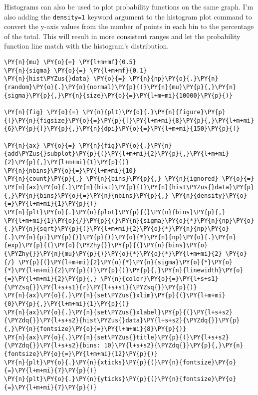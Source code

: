     Histograms can also be used to plot probability functions on the same
graph. I'm also adding the \texttt{density=1} keyword argument to the
histogram plot command to convert the y-axis values from the number of
points in each bin to the percentage of the total. This will result in
more consistent ranges and let the probability function line match with
the histogram's distribution.

    \begin{tcolorbox}[breakable, size=fbox, boxrule=1pt, pad at break*=1mm,colback=cellbackground, colframe=cellborder]
\begin{Verbatim}[commandchars=\\\{\}]
\PY{n}{mu} \PY{o}{=} \PY{l+m+mf}{0.5}
\PY{n}{sigma} \PY{o}{=} \PY{l+m+mf}{0.1}
\PY{n}{hist\PYZus{}data} \PY{o}{=} \PY{n}{np}\PY{o}{.}\PY{n}{random}\PY{o}{.}\PY{n}{normal}\PY{p}{(}\PY{n}{mu}\PY{p}{,}\PY{n}{sigma}\PY{p}{,}\PY{n}{size}\PY{o}{=}\PY{l+m+mi}{10000}\PY{p}{)}

\PY{n}{fig} \PY{o}{=} \PY{n}{plt}\PY{o}{.}\PY{n}{figure}\PY{p}{(}\PY{n}{figsize}\PY{o}{=}\PY{p}{[}\PY{l+m+mi}{8}\PY{p}{,}\PY{l+m+mi}{6}\PY{p}{]}\PY{p}{,}\PY{n}{dpi}\PY{o}{=}\PY{l+m+mi}{150}\PY{p}{)} 

\PY{n}{ax} \PY{o}{=} \PY{n}{fig}\PY{o}{.}\PY{n}{add\PYZus{}subplot}\PY{p}{(}\PY{l+m+mi}{2}\PY{p}{,}\PY{l+m+mi}{2}\PY{p}{,}\PY{l+m+mi}{1}\PY{p}{)}
\PY{n}{nbins}\PY{o}{=}\PY{l+m+mi}{10}
\PY{n}{count}\PY{p}{,} \PY{n}{bins}\PY{p}{,} \PY{n}{ignored} \PY{o}{=} \PY{n}{ax}\PY{o}{.}\PY{n}{hist}\PY{p}{(}\PY{n}{hist\PYZus{}data}\PY{p}{,}\PY{n}{bins}\PY{o}{=}\PY{n}{nbins}\PY{p}{,} \PY{n}{density}\PY{o}{=}\PY{l+m+mi}{1}\PY{p}{)}
\PY{n}{plt}\PY{o}{.}\PY{n}{plot}\PY{p}{(}\PY{n}{bins}\PY{p}{,} \PY{l+m+mi}{1}\PY{o}{/}\PY{p}{(}\PY{n}{sigma}\PY{o}{*}\PY{n}{np}\PY{o}{.}\PY{n}{sqrt}\PY{p}{(}\PY{l+m+mi}{2}\PY{o}{*}\PY{n}{np}\PY{o}{.}\PY{n}{pi}\PY{p}{)}\PY{p}{)}\PY{o}{*}\PY{n}{np}\PY{o}{.}\PY{n}{exp}\PY{p}{(}\PY{o}{\PYZhy{}}\PY{p}{(}\PY{n}{bins}\PY{o}{\PYZhy{}}\PY{n}{mu}\PY{p}{)}\PY{o}{*}\PY{o}{*}\PY{l+m+mi}{2} \PY{o}{/} \PY{p}{(}\PY{l+m+mi}{2}\PY{o}{*}\PY{n}{sigma}\PY{o}{*}\PY{o}{*}\PY{l+m+mi}{2}\PY{p}{)}\PY{p}{)}\PY{p}{,}\PY{n}{linewidth}\PY{o}{=}\PY{l+m+mi}{2}\PY{p}{,} \PY{n}{color}\PY{o}{=}\PY{l+s+s1}{\PYZsq{}}\PY{l+s+s1}{r}\PY{l+s+s1}{\PYZsq{}}\PY{p}{)}
\PY{n}{ax}\PY{o}{.}\PY{n}{set\PYZus{}xlim}\PY{p}{(}\PY{l+m+mi}{0}\PY{p}{,}\PY{l+m+mi}{1}\PY{p}{)}
\PY{n}{ax}\PY{o}{.}\PY{n}{set\PYZus{}xlabel}\PY{p}{(}\PY{l+s+s2}{\PYZdq{}}\PY{l+s+s2}{hist\PYZus{}data}\PY{l+s+s2}{\PYZdq{}}\PY{p}{,}\PY{n}{fontsize}\PY{o}{=}\PY{l+m+mi}{8}\PY{p}{)}
\PY{n}{ax}\PY{o}{.}\PY{n}{set\PYZus{}title}\PY{p}{(}\PY{l+s+s2}{\PYZdq{}}\PY{l+s+s2}{bins: 10}\PY{l+s+s2}{\PYZdq{}}\PY{p}{,}\PY{n}{fontsize}\PY{o}{=}\PY{l+m+mi}{12}\PY{p}{)}
\PY{n}{plt}\PY{o}{.}\PY{n}{xticks}\PY{p}{(}\PY{n}{fontsize}\PY{o}{=}\PY{l+m+mi}{7}\PY{p}{)}
\PY{n}{plt}\PY{o}{.}\PY{n}{yticks}\PY{p}{(}\PY{n}{fontsize}\PY{o}{=}\PY{l+m+mi}{7}\PY{p}{)}


\end{Verbatim}
\end{tcolorbox}
